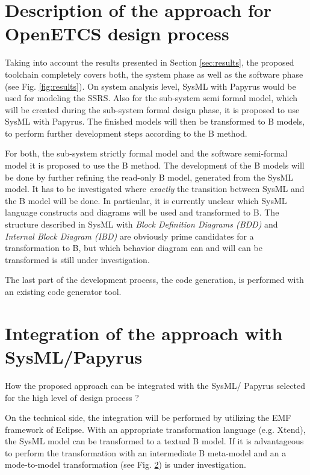 \section{Description of the approach for OpenETCS design process}

Taking into account the results presented in Section
\ref{sec:results}, the proposed toolchain completely covers both, the
system phase as well as the software phase (see
Fig. \ref{fig:results}). On system analysis level, SysML with Papyrus
would be used for modeling the SSRS. Also for the sub-system semi
formal model, which will be created during the sub-system formal
design phase, it is proposed to use SysML with Papyrus. The finished
models will then be transformed to B models, to perform further
development steps according to the B method.

For both, the sub-system strictly formal model and the software
semi-formal model it is proposed to use the B method. The development
of the B models will be done by further refining the read-only B
model, generated from the SysML model. It has to be investigated where
\emph{exactly} the transition between SysML and the B model will be
done. In particular, it is currently unclear which SysML language
constructs and diagrams will be used and transformed to B. The
structure described in SysML with \emph{Block Definition Diagrams
  (BDD)} and \emph{Internal Block Diagram (IBD)} are obviously prime
candidates for a transformation to B, but which behavior diagram can
and will can be transformed is still under investigation.

The last part of the development process, the code generation, is
performed with an existing code generator tool.

\section{Integration of the approach with SysML/Papyrus}

\begin{todo_comment}
How the proposed approach can be integrated with the SysML/ Papyrus selected for the high level of design process ?
\end{todo_comment}

On the technical side, the integration will be performed by utilizing
the EMF framework of Eclipse. With an appropriate transformation
language (e.g. Xtend), the SysML model can be transformed to a textual
B model. If it is advantageous to perform the transformation with an
intermediate B meta-model and an a mode-to-model transformation (see
Fig. \ref{}) is under investigation.

